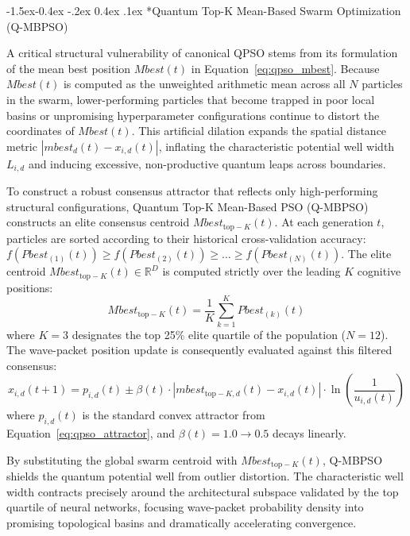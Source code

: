 \documentclass[10pt]{article}
\makeatletter
\renewcommand\subsubsection{\@startsection{subsubsection}{3}{\z@}%
                                     {-1.5ex\@plus -0.4ex \@minus -.2ex}%
                                     {0.4ex \@plus .1ex}%
                                     {\normalfont\itshape\fontsize{7.8pt}{10.0pt}\selectfont}}
\makeatother
\begin{document}
\subsubsection*{Quantum Top-K Mean-Based Swarm Optimization (Q-MBPSO)}

A critical structural vulnerability of canonical QPSO stems from its formulation of the mean best position $Mbest(t)$ in Equation~\eqref{eq:qpso_mbest}. Because $Mbest(t)$ is computed as the unweighted arithmetic mean across all $N$ particles in the swarm, lower-performing particles that become trapped in poor local basins or unpromising hyperparameter configurations continue to distort the coordinates of $Mbest(t)$. This artificial dilation expands the spatial distance metric $|mbest_d(t) - x_{i,d}(t)|$, inflating the characteristic potential well width $L_{i,d}$ and inducing excessive, non-productive quantum leaps across boundaries.

To construct a robust consensus attractor that reflects only high-performing structural configurations, Quantum Top-K Mean-Based PSO (Q-MBPSO) constructs an elite consensus centroid $Mbest_{\mathrm{top-}K}(t)$. At each generation $t$, particles are sorted according to their historical cross-validation accuracy: $f(Pbest_{(1)}(t)) \ge f(Pbest_{(2)}(t)) \ge \dots \ge f(Pbest_{(N)}(t))$. The elite centroid $Mbest_{\mathrm{top-}K}(t) \in \mathbb{R}^D$ is computed strictly over the leading $K$ cognitive positions:
\begin{equation}
Mbest_{\mathrm{top-}K}(t) = \frac{1}{K} \sum_{k=1}^K Pbest_{(k)}(t) \label{eq:qmbpso_mbest}
\end{equation}
where $K = 3$ designates the top 25\% elite quartile of the population ($N = 12$). The wave-packet position update is consequently evaluated against this filtered consensus:
\begin{equation}
x_{i,d}(t+1) = p_{i,d}(t) \pm \beta(t) \cdot |mbest_{\mathrm{top-}K, d}(t) - x_{i,d}(t)| \cdot \ln\left( \frac{1}{u_{i,d}(t)} \right) \label{eq:qmbpso_pos}
\end{equation}
where $p_{i,d}(t)$ is the standard convex attractor from Equation~\eqref{eq:qpso_attractor}, and $\beta(t) = 1.0 \to 0.5$ decays linearly.

By substituting the global swarm centroid with $Mbest_{\mathrm{top-}K}(t)$, Q-MBPSO shields the quantum potential well from outlier distortion. The characteristic well width contracts precisely around the architectural subspace validated by the top quartile of neural networks, focusing wave-packet probability density into promising topological basins and dramatically accelerating convergence.
\end{document}
